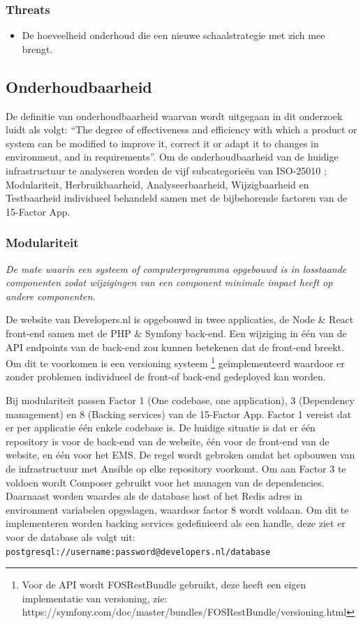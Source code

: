 \subsubsection{Threats}
\begin{itemize}
	\item De hoeveelheid onderhoud die een nieuwe schaalstrategie met zich mee brengt.
\end{itemize}


\subsection{Onderhoudbaarheid}
De definitie van onderhoudbaarheid waarvan wordt uitgegaan in dit onderzoek luidt als volgt: \enquote{The degree of effectiveness and efficiency with which a product or system can be modified to improve it, correct it or adapt it to changes in environment, and in requirements}. Om de onderhoudbaarheid van de huidige infrastructuur te analyseren worden de vijf subcategorieën van ISO-25010 \parencite{ISO25010}; Modulariteit, Herbruikbaarheid, Analyseerbaarheid, Wijzigbaarheid en Testbaarheid individueel behandeld samen met de bijbehorende factoren van de 15-Factor App.

\subsubsection{Modulariteit} %
\textit{De mate waarin een systeem of computerprogramma opgebouwd is in losstaande componenten zodat wijzigingen van een component minimale impact heeft op andere componenten.}

De website van Developers.nl is opgebouwd in twee applicaties, de Node \& React front-end samen met de PHP \& Symfony back-end. Een wijziging in één van de API endpoints van de back-end zou kunnen betekenen dat de front-end breekt. Om dit te voorkomen is een versioning systeem \footnote{Voor de API wordt FOSRestBundle gebruikt, deze heeft een eigen implementatie van versioning, zie: https://symfony.com/doc/master/bundles/FOSRestBundle/versioning.html} geïmplementeerd waardoor er zonder problemen individueel de front-of back-end gedeployed kan worden.

Bij modulariteit passen Factor 1 (One codebase, one application), 3 (Dependency management) en 8 (Backing services) van de 15-Factor App. Factor 1 vereist dat er per applicatie één enkele codebase is. De huidige situatie is dat er één repository is voor de back-end van de website, één voor de front-end van de website, en één voor het EMS. De regel wordt gebroken omdat het opbouwen van de infrastructuur met Ansible op elke repository voorkomt. Om aan Factor 3 te voldoen wordt Composer gebruikt voor het managen van de dependencies. Daarnaast worden waardes als de database host of het Redis adres in environment variabelen opgeslagen, waardoor factor 8 wordt voldaan. Om dit te implementeren worden backing services gedefinieerd als een handle, deze ziet er voor de database als volgt uit:\\ \texttt{postgresql://username:password@developers.nl/database}

